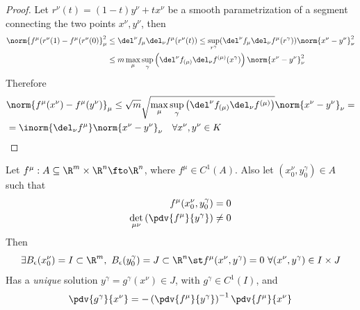 \documentclass[../mmf.tex]{subfiles}
\begin{document}
\begin{proof}
	Let $r^\nu(t)=(1-t)y^\nu+tx^\nu$ be a smooth parametrization of a segment connecting the two points $x^\nu,y^\nu$, then
	\begin{equation*}
		\begin{aligned}
			\norm{f^\mu(r^\nu(1)-f^\mu(r^\nu(0)}^2_\mu&\le\del^\nu f_\mu\del_\nu f^\mu(r^\nu(t))\le\sup_{r^\gamma}(\del^\nu f_\mu\del_\nu f^\mu(r^\gamma))\norm{x^\nu-y^\nu}_\nu^2\\
			&\le m\max_\mu\sup_\gamma\left(\del^\nu f_{(\mu)}\del_\nu f^{(\mu)}(x^\gamma)\right)\norm{x^\nu-y^\nu}_\nu^2
		\end{aligned}
	\end{equation*}
	Therefore
	\begin{equation*}
		\begin{aligned}
			&\norm{f^\mu(x^\nu)-f^\mu(y^\nu)}_\mu\le\sqrt{m}\sqrt{\max_\mu\sup_\gamma\left(\del^\nu f_{(\mu)}\del_\nu f^{(\mu)}\right)}\norm{x^\nu-y^\nu}_\nu=\\
			&=\inorm{\del_\nu f^\mu}\norm{x^\nu-y^\nu}_\nu\quad\forall x^\nu,y^\nu\in K
		\end{aligned}
	\end{equation*}
\end{proof}
\begin{thm}
	Let $f^\mu:A\subseteq\R^m\times\R^n\fto\R^n$, where $f^\mu\in C^1(A)$. Also let $(x^\nu_0,y^\gamma_0)\in A$ such that
	\begin{equation*}
		\begin{aligned}
			f^\mu(x^\nu_0,y^\gamma_0)&=0\\
			\det_{\mu\nu}\left(\pdv{f^\mu}{y^\gamma}\right)&\ne0
		\end{aligned}
	\end{equation*}
	Then
	\begin{equation*}
		\exists B_\epsilon(x^\nu_0)=I\subset\R^m,\ B_\epsilon(y^\gamma_0)=J\subset\R^n\st f^\mu(x^\nu,y^\gamma)=0\ \forall(x^\nu,y^\gamma)\in I\times J
	\end{equation*}
	Has a \emph{unique} solution $y^\gamma=g^\gamma(x^\nu)\in J$, with $g^\gamma\in C^1(I)$, and
	\begin{equation}
		\pdv{g^\gamma}{x^\nu}=-\left( \pdv{f^\mu}{y^\gamma} \right)^{-1}\pdv{f^\mu}{x^\nu}
		\label{eq:dinider}
	\end{equation}
\end{thm}
\end{document}
